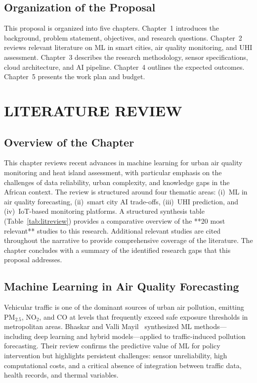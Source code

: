\documentclass[12pt,a4paper]{report}
\begin{document}
\section{Organization of the Proposal}
This proposal is organized into five chapters. Chapter~1 introduces the background, problem statement, objectives, and research questions. Chapter~2 reviews relevant literature on ML in smart cities, air quality monitoring, and UHI assessment. Chapter~3 describes the research methodology, sensor specifications, cloud architecture, and AI pipeline. Chapter~4 outlines the expected outcomes. Chapter~5 presents the work plan and budget.

\chapter{LITERATURE REVIEW}

\section{Overview of the Chapter}
This chapter reviews recent advances in machine learning for urban air quality monitoring and heat island assessment, with particular emphasis on the challenges of data reliability, urban complexity, and knowledge gaps in the African context. The review is structured around four thematic areas: (i)~ML in air quality forecasting, (ii)~smart city AI trade-offs, (iii)~UHI prediction, and (iv)~IoT-based monitoring platforms. A structured synthesis table (Table~\ref{tab:litreview}) provides a comparative overview of the **20 most relevant** studies to this research. Additional relevant studies are cited throughout the narrative to provide comprehensive coverage of the literature. The chapter concludes with a summary of the identified research gaps that this proposal addresses.

\section{Machine Learning in Air Quality Forecasting}
Vehicular traffic is one of the dominant sources of urban air pollution, emitting PM$_{2.5}$, NO$_2$, and CO at levels that frequently exceed safe exposure thresholds in metropolitan areas. Bhaskar and Valli Mayil~\cite{bhaskar2025} synthesized ML methods—including deep learning and hybrid models—applied to traffic-induced pollution forecasting. Their review confirms the predictive value of ML for policy intervention but highlights persistent challenges: sensor unreliability, high computational costs, and a critical absence of integration between traffic data, health records, and thermal variables.
\end{document}
